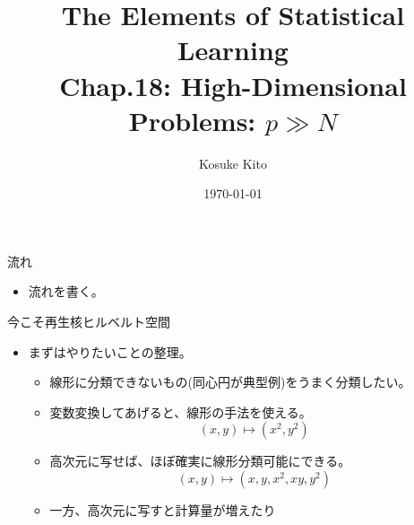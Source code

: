 \documentclass[dvipdfmx,8pt]{beamer}
\title{The Elements of Statistical Learning\\Chap.18: High-Dimensional Problems: $p \gg N$}
\date{\today}
\author{Kosuke Kito}
\begin{document}
  \maketitle
  \begin{frame}{流れ}
    \begin{itemize}
      \item 流れを書く。
    \end{itemize}
  \end{frame}
  \begin{frame}{今こそ再生核ヒルベルト空間}
    \begin{itemize}
      \item まずはやりたいことの整理。\\
        \begin{itemize}
          \item 線形に分類できないもの(同心円が典型例)をうまく分類したい。
          \item 変数変換してあげると、線形の手法を使える。\\
            \[
              (x,y) \mapsto (x^2,y^2)
            \]
          \item 高次元に写せば、ほぼ確実に線形分類可能にできる。
            \[
              (x,y)\mapsto (x,y,x^2,xy,y^2)
            \]
          \item 一方、高次元に写すと計算量が増えたり
        \end{itemize}
    \end{itemize}
  \end{frame}
\end{document}
